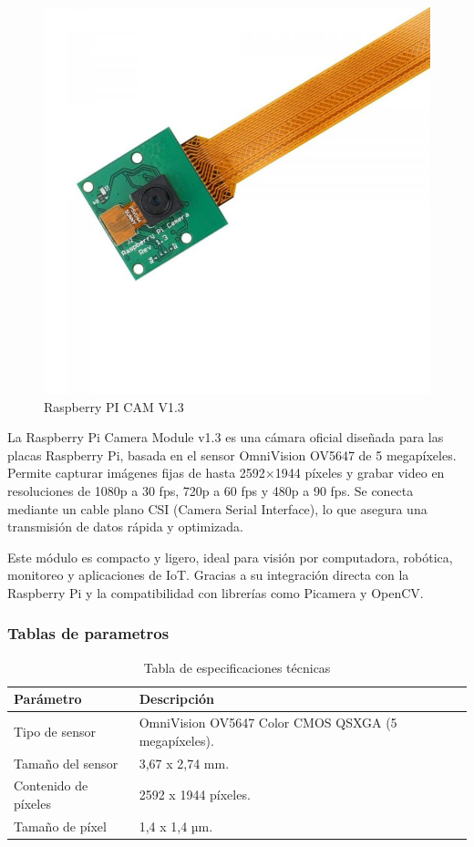 \documentclass[12pt,a4paper]{article}
\begin{document}
\begin{figure}[H]
    \centering
    \includegraphics[width=0.5\linewidth]{Carpeta tecnica/berrycam.png}
    \caption{Raspberry PI CAM V1.3}
\end{figure}

La Raspberry Pi Camera Module v1.3 es una cámara oficial diseñada para las placas Raspberry Pi, basada en el sensor OmniVision OV5647 de 5 megapíxeles. Permite capturar imágenes fijas de hasta 2592×1944 píxeles y grabar video en resoluciones de 1080p a 30 fps, 720p a 60 fps y 480p a 90 fps. Se conecta mediante un cable plano CSI (Camera Serial Interface), lo que asegura una transmisión de datos rápida y optimizada.

Este módulo es compacto y ligero, ideal para visión por computadora, robótica, monitoreo y aplicaciones de IoT. Gracias a su integración directa con la Raspberry Pi y la compatibilidad con librerías como Picamera y OpenCV.

\subsubsection{Tablas de parametros}

\begin{table}[H]
\begin{tabular}{|p{4cm}|p{11cm}|}
\hline
\textbf{Parámetro} & \textbf{Descripción} \\ \hline
Tipo de sensor & OmniVision OV5647 Color CMOS QSXGA (5 megapíxeles). \\ \hline
Tamaño del sensor & 3,67 x 2,74 mm. \\ \hline
Contenido de píxeles & 2592 x 1944 píxeles. \\ \hline
Tamaño de píxel & 1,4 x 1,4 µm. \\ \hline
\end{tabular}
\caption{Tabla de especificaciones técnicas}
\end{table}
\end{document}
